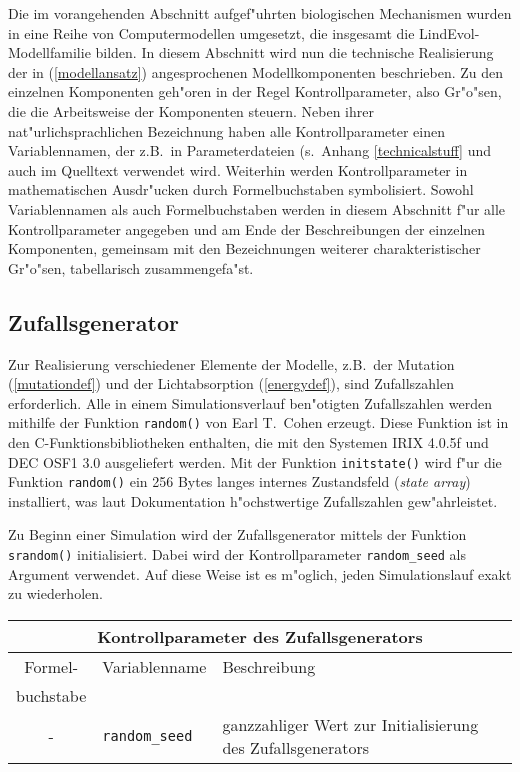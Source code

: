 Die im vorangehenden Abschnitt aufgef"uhrten biologischen Mechanismen wurden
in eine Reihe von Computermodellen umgesetzt, die insgesamt die LindEvol-Modellfamilie
bilden. In diesem Abschnitt wird nun die technische Realisierung der
in (\ref{modellansatz}) angesprochenen Modellkomponenten beschrieben.
Zu den einzelnen Komponenten geh"oren in der Regel Kontrollparameter, also
Gr"o"sen, die die Arbeitsweise der Komponenten steuern. Neben ihrer nat"urlichsprachlichen
Bezeichnung haben alle Kontrollparameter einen Variablennamen, der z.B.\ in
Parameterdateien (s.\ Anhang \ref{technicalstuff} und auch im Quelltext verwendet wird. Weiterhin werden
Kontrollparameter in mathematischen Ausdr"ucken durch Formelbuchstaben
symbolisiert. Sowohl Variablennamen als auch Formelbuchstaben werden in diesem
Abschnitt f"ur alle Kontrollparameter angegeben und am Ende der Beschreibungen
der einzelnen Komponenten, gemeinsam mit den Bezeichnungen weiterer charakteristischer
Gr"o"sen, tabellarisch zusammengefa"st.


\subsection{Zufallsgenerator}
\label{rndgeneratordef}

Zur Realisierung verschiedener Elemente der Modelle, z.B.\ der
Mutation (\ref{mutationdef}) und der Lichtabsorption
(\ref{energydef}), sind Zufallszahlen erforderlich. 
Alle in einem Simulationsverlauf ben"otigten Zufallszahlen werden mithilfe der
Funktion \verb|random()| von Earl T.\ Cohen erzeugt. Diese Funktion ist in den
C-Funktionsbibliotheken enthalten, die mit den Systemen IRIX 4.0.5f und DEC OSF1 3.0
ausgeliefert werden. Mit der Funktion \verb|initstate()| wird f"ur die Funktion
\verb|random()| ein 256 Bytes langes internes Zustandsfeld ({\slshape state array}\/)
installiert, was laut Dokumentation h"ochstwertige Zufallszahlen gew"ahrleistet.

Zu Beginn einer Simulation wird der Zufallsgenerator mittels der Funktion
\verb|srandom()| initialisiert. Dabei wird der Kontrollparameter \verb|random_seed|
als Argument verwendet. Auf diese Weise ist es m"oglich, jeden Simulationslauf
exakt zu wiederholen.

\medskip
\noindent\begin{tabularx}{\linewidth}{|c|l|X|} \hline
\multicolumn{3}{|c|}{\bfseries Kontrollparameter des Zufallsgenerators} \\ \hline
Formel- & Variablenname & Beschreibung \\
buchstabe &              & \\ \hline
- & \verb|random_seed| & ganzzahliger Wert zur Initialisierung des Zu\-falls\-ge\-ne\-ra\-tors \\ \hline
\end{tabularx}
\medskip


